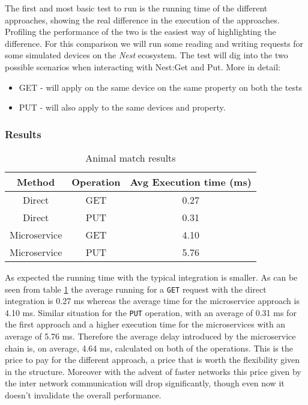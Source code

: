 The first and most basic test to run is the running time of the different approaches,
showing the real difference in the execution of the approaches. Profiling the performance
of the two is the easiest way of highlighting the difference.\newline
For this comparison we will run some reading and writing requests for some simulated devices
on the \textit{Nest} ecosystem. The test will dig into the two possible scenarios when interacting with
Nest:Get and Put. More in detail:

\begin{itemize}
    \item GET - will apply on the same device on the same property on both the tests
    \item PUT - will also apply to the same devices and property.
\end{itemize}

\subsubsection{Results}

\begin{table}

\centering
\caption{Animal match results}
\label{tab:nestbasic}
\begin{tabular}{|c|c|c|} \hline
\textbf{Method} &  \textbf{Operation} & \textbf{Avg Execution time (ms)} \\ \hline
    Direct & GET & 0.27 \\ \hline
    Direct & PUT & 0.31 \\ \hline
    Microservice & GET & 4.10 \\ \hline
    Microservice & PUT & 5.76 \\ \hline
\end{tabular}
\end{table}

As expected the running time with the typical integration is smaller. As can be seen
from table \ref{tab:nestbasic} the average running for a \texttt{GET} request with the direct integration is 0.27 ms whereas the average time for
the microservice approach is 4.10 ms. Similar situation for the \texttt{PUT} operation, with an average of 0.31 ms for the first approach and a higher
execution time for the microservices with an average of 5.76 ms.
Therefore the average delay introduced by the microservice chain is,
on average, 4.64 ms, calculated on both of the operations. This is the price to pay for the different approach, a price that is worth the flexibility
given in the structure. Moreover with the advent of faster networks this price given by the inter network communication will drop
significantly, though even now it doesn't invalidate the overall performance.


